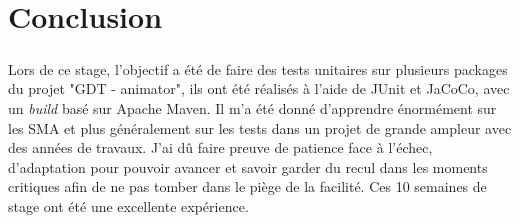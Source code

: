 \chapter{Conclusion}
\paragraph{}
Lors de ce stage, l'objectif a été de faire des tests unitaires sur plusieurs packages du projet "GDT - animator", ils ont été réalisés à l'aide de JUnit et JaCoCo, avec un \textit{build} basé sur Apache Maven. Il m'a été donné d'apprendre énormément sur les SMA et plus généralement sur les tests dans un projet de grande ampleur avec des années de travaux.
J'ai dû faire preuve de patience face à l'échec, d'adaptation pour pouvoir avancer et savoir garder du recul dans les moments critiques afin de ne pas tomber dans le piège de la facilité. Ces 10 semaines de stage ont été une excellente expérience.